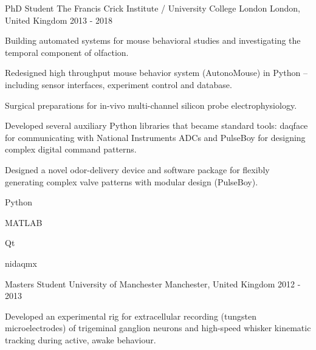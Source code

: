 \begin{cventries}
  \cventry%
    {PhD Student} %
    {The Francis Crick Institute / University College London} %
    {London, United Kingdom} %
    {2013 \-- 2018} %
    {%
      \begin{cvsentence}Building automated systems for mouse behavioral studies and investigating the temporal component of olfaction.\end{cvsentence}
      \begin{cvitems} %
        \item {Redesigned high throughput mouse behavior system (AutonoMouse) in Python – including sensor interfaces, experiment control and database.}
        \item {Surgical preparations for in-vivo multi-channel silicon probe electrophysiology.}
        \item {Developed several auxiliary Python libraries that became standard tools: daqface for communicating with National Instruments ADCs and PulseBoy for designing complex digital command patterns.  }
        \item {Designed a novel odor-delivery device and software package for ﬂexibly generating complex valve patterns with modular design (PulseBoy).}
      \end{cvitems}
    }
    \begin{cventryskills}
      \item Python
      \item MATLAB
      \item Qt
      \item nidaqmx
    \end{cventryskills}

  \cventry%
    {Masters Student} %
    {University of Manchester} %
    {Manchester, United Kingdom} %
    {2012 \-- 2013} %
    {%
      \begin{cvsentence}Developed an experimental rig for extracellular recording (tungsten microelectrodes) of trigeminal ganglion neurons and high-speed whisker kinematic tracking during active, awake behaviour.\end{cvsentence}
    }
\end{cventries}
